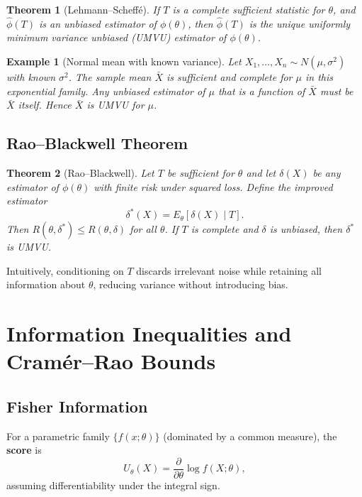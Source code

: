 \documentclass[11pt,a4paper]{article}
\newtheorem{theorem}{Theorem}[section]
\newtheorem{example}{Example}[section]
\numberwithin{equation}{section}
\begin{document}
\begin{theorem}[Lehmann--Scheff\'e]
If $T$ is a complete sufficient statistic for $\theta$, and $\hat{\phi}(T)$ is an unbiased estimator of $\phi(\theta)$, then $\hat{\phi}(T)$ is the unique uniformly minimum variance unbiased (UMVU) estimator of $\phi(\theta)$.
\end{theorem}

\begin{example}[Normal mean with known variance]
Let $X_1,\dots,X_n \sim N(\mu,\sigma^2)$ with known $\sigma^2$. 
The sample mean $\bar{X}$ is sufficient and complete for $\mu$ in this exponential family. 
Any unbiased estimator of $\mu$ that is a function of $\bar{X}$ must be $\bar{X}$ itself. 
Hence $\bar{X}$ is UMVU for $\mu$.

\end{example}

\subsection{Rao--Blackwell Theorem}

\begin{theorem}[Rao--Blackwell]
Let $T$ be sufficient for $\theta$ and let $\delta(X)$ be any estimator of $\phi(\theta)$ with finite risk under squared loss. 
Define the improved estimator
\[
\delta^*(X) = E_\theta[\delta(X) \mid T].
\]
Then $R(\theta,\delta^*) \le R(\theta,\delta)$ for all $\theta$. 
If $T$ is complete and $\delta$ is unbiased, then $\delta^*$ is UMVU.
\end{theorem}

Intuitively, conditioning on $T$ discards irrelevant noise while retaining all information about $\theta$, reducing variance without introducing bias.

\newpage

\section{Information Inequalities and Cram\'er--Rao Bounds}

\subsection{Fisher Information}

For a parametric family $\{f(x;\theta)\}$ (dominated by a common measure), the \textbf{score} is
\[
U_\theta(X) = \frac{\partial}{\partial\theta}\log f(X;\theta),
\]
assuming differentiability under the integral sign.
\end{document}
